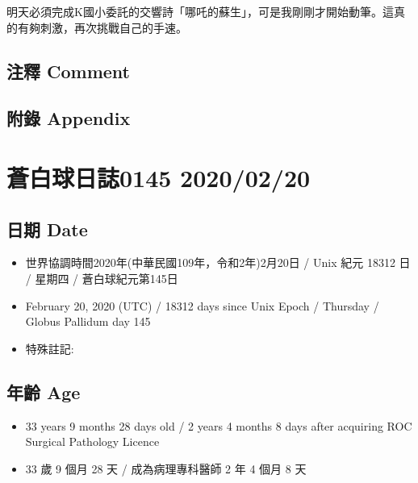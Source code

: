 \documentclass[a5paper, 12pt
]{book}
\providecommand{\tightlist}{%
  \setlength{\itemsep}{0pt}\setlength{\parskip}{0pt}}
\begin{document}
明天必須完成K國小委託的交響詩「哪吒的蘇生」，可是我剛剛才開始動筆。這真的有夠刺激，再次挑戰自己的手速。

\hypertarget{ux6ce8ux91cb-comment-79}{%
\subsection{注釋 Comment}\label{ux6ce8ux91cb-comment-79}}

\hypertarget{ux9644ux9304-appendix-80}{%
\subsection{附錄 Appendix}\label{ux9644ux9304-appendix-80}}

\hypertarget{ux84bcux767dux7403ux65e5ux8a8c0145-20200220}{%
\section{蒼白球日誌0145
2020/02/20}\label{ux84bcux767dux7403ux65e5ux8a8c0145-20200220}}

\hypertarget{ux65e5ux671f-date-81}{%
\subsection{日期 Date}\label{ux65e5ux671f-date-81}}

\begin{itemize}
\tightlist
\item
  世界協調時間2020年(中華民國109年，令和2年)2月20日 / Unix 紀元 18312 日
  / 星期四 / 蒼白球紀元第145日
\item
  February 20, 2020 (UTC) / 18312 days since Unix Epoch / Thursday /
  Globus Pallidum day 145
\item
  特殊註記:
\end{itemize}

\hypertarget{ux5e74ux9f61-age-81}{%
\subsection{年齡 Age}\label{ux5e74ux9f61-age-81}}

\begin{itemize}
\tightlist
\item
  33 years 9 months 28 days old / 2 years 4 months 8 days after
  acquiring ROC Surgical Pathology Licence
\item
  33 歲 9 個月 28 天 / 成為病理專科醫師 2 年 4 個月 8 天
\end{itemize}
\end{document}
